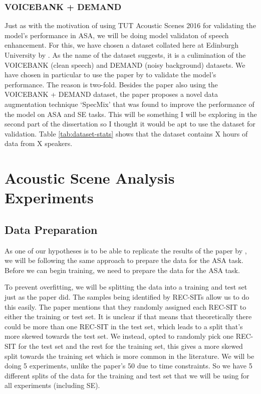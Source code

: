 \documentclass[logo,bsc,singlespacing,parskip,online]{infthesis}
\begin{document}
\subsection{VOICEBANK + DEMAND}
Just as with the motivation of using TUT Acoustic Scenes 2016 for validating the model's performance in ASA,
we will be doing model validaton of speech enhancement. 
For this, we have chosen a dataset collated here at Edinburgh University by \citet{valentini-botinhao_speech_2016}. 
As the name of the dataset suggests, it is a culimination of the VOICEBANK \cite{TODO} (clean speech) and DEMAND \cite{TODO} (noisy background) datasets.
We have chosen in particular to use the paper by \citet{kim_specmix_2021} to validate the model's performance.
The reason is two-fold. Besides the paper also using the VOICEBANK + DEMAND dataset, the paper proposes a novel data augmentation technique
`SpecMix' that was found to improve the performance of the model on ASA and SE tasks. This will be something I will be exploring in the 
second part of the dissertation so I thought it would be apt to use the dataset for validation.
Table \ref{tab:dataset-stats} shows that the dataset contains X hours of data from X speakers.

\chapter{Acoustic Scene Analysis Experiments}
\label{chap:acoustic-scene-classification}
\section{Data Preparation}
\label{sec:data-preparation}
As one of our hypotheses is to be able to replicate the results of the paper by \citet{Huwel2020HearDS}, 
we will be following the same approach to prepare the data for the ASA task. 
Before we can begin training, we need to prepare the data for the ASA task.

To prevent overfitting, we will be splitting the data into a training and test set just as the paper did.
The samples being identified by REC-SITs allow us to do this easily. The paper mentions that they randomly 
assigned each REC-SIT to either the training or test set. It is unclear if 
that means that theoretically there could be more than one REC-SIT in the test set, which 
leads to a split that's more skewed towards the test set. We instead, opted to randomly pick 
one REC-SIT for the test set and the rest for the training set, this gives a more 
skewed split towards the training set which is more common in the literature.
We will be doing 5 experiments, unlike the paper's 50 due to time constraints. So 
we have 5 different splits of the data for the training and test set that we will be using 
for all experiments (including SE).
\end{document}
